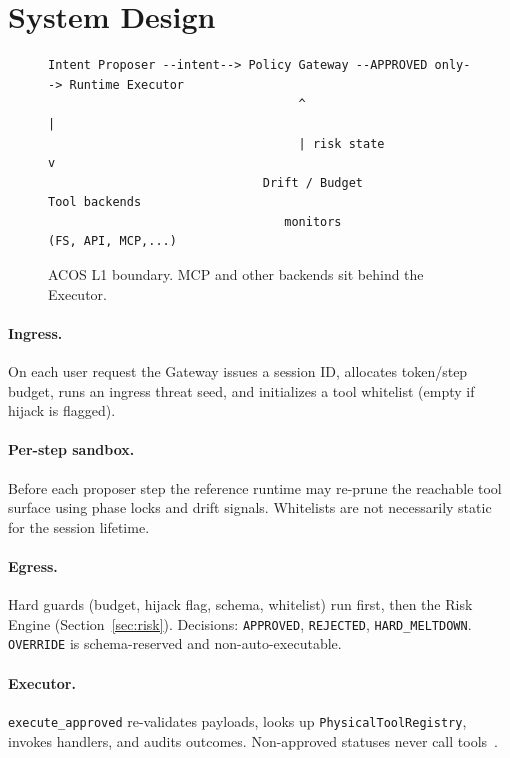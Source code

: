 \documentclass{article}
\begin{document}
\section{System Design}
\label{sec:system}

\begin{figure}[t]
\centering
\small
\begin{verbatim}
Intent Proposer --intent--> Policy Gateway --APPROVED only--> Runtime Executor
                                   ^                              |
                                   | risk state                   v
                              Drift / Budget                 Tool backends
                                 monitors                 (FS, API, MCP,...)
\end{verbatim}
\caption{ACOS L1 boundary. MCP and other backends sit behind the Executor.}
\label{fig:arch}
\end{figure}

\paragraph{Ingress.}
On each user request the Gateway issues a session ID, allocates token/step
budget, runs an ingress threat seed, and initializes a tool whitelist (empty
if hijack is flagged).

\paragraph{Per-step sandbox.}
Before each proposer step the reference runtime may re-prune the reachable
tool surface using phase locks and drift signals. Whitelists are not
necessarily static for the session lifetime.

\paragraph{Egress.}
Hard guards (budget, hijack flag, schema, whitelist) run first, then the Risk
Engine (Section~\ref{sec:risk}). Decisions:
\texttt{APPROVED}, \texttt{REJECTED}, \texttt{HARD\_MELTDOWN}.
\texttt{OVERRIDE} is schema-reserved and non-auto-executable.

\paragraph{Executor.}
\texttt{execute\_approved} re-validates payloads, looks up
\texttt{PhysicalToolRegistry}, invokes handlers, and audits outcomes.
Non-approved statuses never call tools~\citep{acos2026}.
\end{document}
